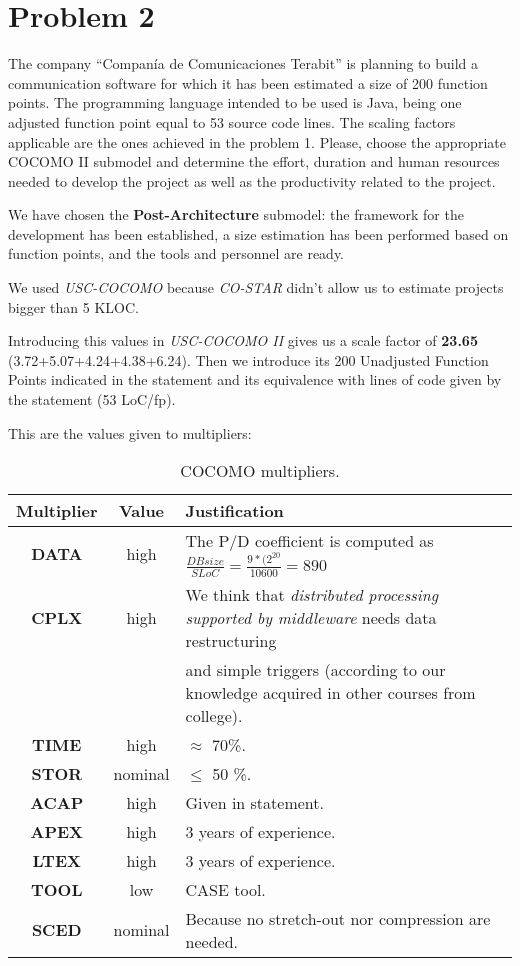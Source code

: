 \section{Problem 2}

The company ``Compan\'ia de Comunicaciones Terabit'' is planning to build a communication software for which it has been estimated a size of 200 function points. The programming language intended to be used is Java, being one adjusted function point equal to 53 source code lines. The scaling factors applicable are the ones achieved in the problem 1. Please, choose the appropriate COCOMO II submodel and determine the effort, duration and human resources needed to develop the project as well as the productivity related to the project.

\seprule

We have chosen the \textbf{Post-Architecture} submodel: the framework for the development has been established, a size estimation has been performed based on function points, and the tools and personnel are ready.

We used \textit{USC-COCOMO} because \textit{CO-STAR} didn't allow us to estimate projects bigger than 5 KLOC. 

Introducing this values in \textit{USC-COCOMO II} gives us a scale factor of \textbf{23.65} (3.72+5.07+4.24+4.38+6.24). Then we introduce its 200 Unadjusted Function Points indicated in the statement and its equivalence with lines of code given by the statement (53 LoC/fp).

This are the values given to multipliers:

\begin{table}[hbtp]
\centering
\begin{tabular}{|c|c|l|}
\hline
\textbf{Multiplier} & \textbf{Value} & \textbf{Justification} \\ \hline
\textbf{DATA} & high & The P/D coefficient is computed as $\frac{DB size}{SLoC} = \frac{9*(2^{20}}{10600} = 890$\\ \hline
\textbf{CPLX} & high & We think that \textit{distributed processing supported by middleware} needs data restructuring\\ & & and simple triggers (according to our knowledge acquired in other courses from college). \\ \hline
\textbf{TIME} & high & $\approx$ 70\%.  \\ \hline
\textbf{STOR} & nominal & $\leq$ 50 \%. \\ \hline
\textbf{ACAP} & high & Given in statement. \\ \hline
\textbf{APEX} & high & 3 years of experience. \\ \hline
\textbf{LTEX} & high & 3 years of experience. \\ \hline
\textbf{TOOL} & low & CASE tool. \\ \hline
\textbf{SCED} & nominal & Because no stretch-out nor compression are needed. \\ \hline
\end{tabular}
\caption{COCOMO multipliers.}
\label{tblMultipliersProblem2}
\end{table}

